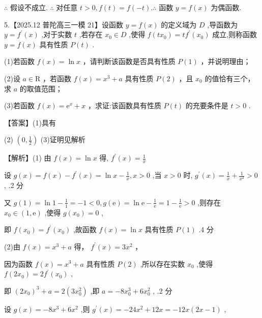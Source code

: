 \documentclass[10pt]{article}
\begin{document}
\(\therefore\) 假设不成立. \(\therefore\) 对任意 \(t > 0,f\left( t\right)  = f\left( {-t}\right) .\therefore\) 函数 \(y = f\left( x\right)\) 为偶函数.

5.【2025.12 普陀高三一模 21】设函数 \(y = f\left( x\right)\) 的定义域为 \(D\) ,导函数为 \(y = {f}^{\prime }\left( x\right)\) ,对于实数 \(t\) ,若存在 \({x}_{0} \in  D\) ,使得 \(f\left( {t{x}_{0}}\right)  = t{f}^{\prime }\left( {x}_{0}\right)\) 成立,则称函数 \(y = f\left( x\right)\) 具有性质 \(P\left( t\right)\) .

(1)若函数 \(f\left( x\right)  = \ln x\) ，请判断该函数是否具有性质 \(P\left( 1\right)\) ，并说明理由；

(2)设 \(a \in  \mathrm{R}\) ，若函数 \(f\left( x\right)  = {x}^{3} + a\) 具有性质 \(P\left( 2\right)\) ，且 \({x}_{0}\) 的值恰有三个，求 \(a\) 的取值范围；

(3)若函数 \(f\left( x\right)  = {\mathrm{e}}^{x} + x\) ，求证:该函数具有性质 \(P\left( t\right)\) 的充要条件是 \(t > 0\) .

【答案】(1)具有

(2) \(\left( {0,\frac{1}{2}}\right)\) (3)证明见解析

【解析】(1) 由 \(f\left( x\right)  = \ln x\) 得, \({f}^{\prime }\left( x\right)  = \frac{1}{x}\)

设 \(g\left( x\right)  = f\left( x\right)  - {f}^{\prime }\left( x\right)  = \ln x - \frac{1}{x},x > 0\) ,当 \(x > 0\) 时, \({g}^{\prime }\left( x\right)  = \frac{1}{x} + \frac{1}{{x}^{2}} > 0\) , .2 分

又 \(g\left( 1\right)  = \ln 1 - \frac{1}{1} =  - 1 < 0,g\left( \mathrm{e}\right)  = \ln \mathrm{e} - \frac{1}{\mathrm{e}} = 1 - \frac{1}{\mathrm{e}} > 0\) ,则存在 \({x}_{0} \in  \left( {1,\mathrm{e}}\right)\) ,使得 \(g\left( {x}_{0}\right)  = 0\) ,

即 \(f\left( {x}_{0}\right)  = {f}^{\prime }\left( {x}_{0}\right)\) ,故函数 \(f\left( x\right)  = \ln x\) 具有性质 \(P\left( 1\right)\) .4 分

(2)由 \(f\left( x\right)  = {x}^{3} + a\) 得， \({f}^{\prime }\left( x\right)  = 3{x}^{2}\) ，

因为函数 \(f\left( x\right)  = {x}^{3} + a\) 具有性质 \(P\left( 2\right)\) ,所以存在实数 \({x}_{0}\) ,使得 \(f\left( {2{x}_{0}}\right)  = 2{f}^{\prime }\left( {x}_{0}\right)\) ,

即 \({\left( 2{x}_{0}\right) }^{3} + a = 2\left( {3{x}_{0}^{2}}\right)\) ,即 \(a =  - 8{x}_{0}^{3} + 6{x}_{0}^{2}\) , .2 分

设 \(g\left( x\right)  =  - 8{x}^{3} + 6{x}^{2}\) ,则 \({g}^{\prime }\left( x\right)  =  - {24}{x}^{2} + {12x} =  - {12x}\left( {{2x} - 1}\right)\) ,
\end{document}
